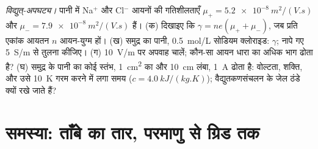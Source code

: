 \begin{exercise}[$\star\star\star$]\label{exo:b2:charges-currents-conduction:12}
\emph{विद्युत्-अपघट्य।} पानी में Na$^+$ और Cl$^-$ आयनों की गतिशीलताएँ
$\mu_+ = \qty{5.2e-8}{m^2/(V.s)}$ और $\mu_- = \qty{7.9e-8}{m^2/(V.s)}$ हैं। (क)
दिखाइए कि $\gamma = ne(\mu_+ + \mu_-)$, जब प्रति एकांक आयतन $n$ आयन-युग्म हों।
(ख) समुद्र का पानी, \qty{0.5}{mol/L} सोडियम क्लोराइड: $\gamma$; नापे गए
\qty{5}{S/m} से तुलना कीजिए। (ग) \qty{10}{V/m} पर अपवाह चालें; कौन-सा आयन धारा का
अधिक भाग ढोता है? (घ) समुद्र के पानी का कोई स्तंभ, \qty{1}{cm^2} का और \qty{10}{cm} लंबा,
\qty{1}{A} ढोता है: वोल्टता, शक्ति, और उसे \qty{10}{K} गरम करने में लगा समय ($c =
\qty{4.0}{kJ/(kg.K)}$); वैद्युतकणसंचलन के जेल ठंडे क्यों रखे जाते हैं?
\end{exercise}

\section{समस्या: ताँबे का तार, परमाणु से ग्रिड तक}

